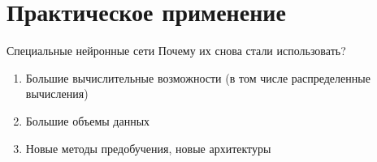 \documentclass[10pt]{beamer}
\begin{document}



\section{Практическое применение}

\begin{frame}{Специальные нейронные сети}
	Почему их снова стали использовать?\\
	\pause
	\begin{enumerate}[--]
		\item Большие вычислительные возможности (в том числе
		распределенные вычисления)
		\item Большие объемы данных
		\item Новые методы предобучения, новые архитектуры
	\end{enumerate}
\end{frame}
\end{document}
